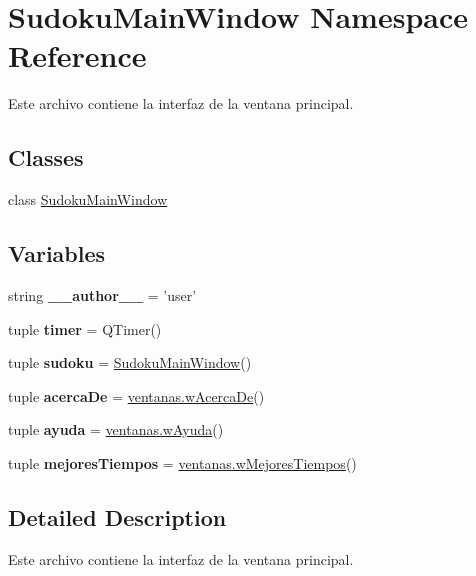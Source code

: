 \hypertarget{namespace_sudoku_main_window}{\section{Sudoku\-Main\-Window Namespace Reference}
\label{namespace_sudoku_main_window}
}


Este archivo contiene la interfaz de la ventana principal.  


\subsection*{Classes}
\begin{DoxyCompactItemize}
\item 
class \hyperlink{class_sudoku_main_window_1_1_sudoku_main_window}{Sudoku\-Main\-Window}
\end{DoxyCompactItemize}
\subsection*{Variables}
\begin{DoxyCompactItemize}
\item 
\hypertarget{namespace_sudoku_main_window_a6ae78ac4268752c431aac0753cef7fda}{string {\bfseries \-\_\-\-\_\-author\-\_\-\-\_\-} = 'user'}\label{namespace_sudoku_main_window_a6ae78ac4268752c431aac0753cef7fda}

\item 
\hypertarget{namespace_sudoku_main_window_a9987028fc6a39b7d72c438ef465f4d5c}{tuple {\bfseries timer} = Q\-Timer()}\label{namespace_sudoku_main_window_a9987028fc6a39b7d72c438ef465f4d5c}

\item 
\hypertarget{namespace_sudoku_main_window_adfbc10a324850ef667e112a43d373a3f}{tuple {\bfseries sudoku} = \hyperlink{class_sudoku_main_window_1_1_sudoku_main_window}{Sudoku\-Main\-Window}()}\label{namespace_sudoku_main_window_adfbc10a324850ef667e112a43d373a3f}

\item 
\hypertarget{namespace_sudoku_main_window_af2c821d9cac0d9d48afe8dc47dd88796}{tuple {\bfseries acerca\-De} = \hyperlink{classventanas_1_1w_acerca_de}{ventanas.\-w\-Acerca\-De}()}\label{namespace_sudoku_main_window_af2c821d9cac0d9d48afe8dc47dd88796}

\item 
\hypertarget{namespace_sudoku_main_window_ad87780c011ac73ffd9418fa99e69a13c}{tuple {\bfseries ayuda} = \hyperlink{classventanas_1_1w_ayuda}{ventanas.\-w\-Ayuda}()}\label{namespace_sudoku_main_window_ad87780c011ac73ffd9418fa99e69a13c}

\item 
\hypertarget{namespace_sudoku_main_window_aaaf4c59bb37372582cb7062e6792c711}{tuple {\bfseries mejores\-Tiempos} = \hyperlink{classventanas_1_1w_mejores_tiempos}{ventanas.\-w\-Mejores\-Tiempos}()}\label{namespace_sudoku_main_window_aaaf4c59bb37372582cb7062e6792c711}

\end{DoxyCompactItemize}


\subsection{Detailed Description}
Este archivo contiene la interfaz de la ventana principal. 